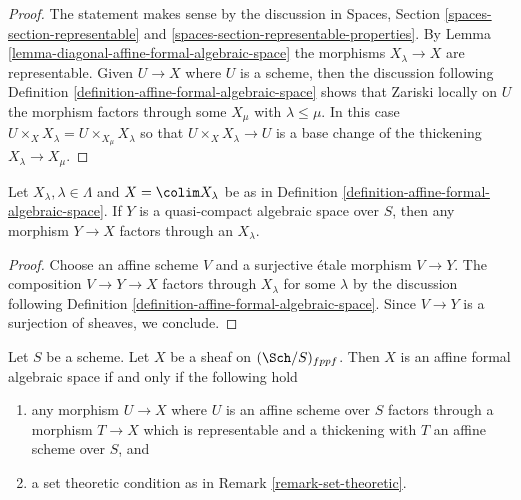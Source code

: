 \begin{proof}
The statement makes sense by the discussion in
Spaces, Section \ref{spaces-section-representable} and
\ref{spaces-section-representable-properties}.
By Lemma \ref{lemma-diagonal-affine-formal-algebraic-space}
the morphisms $X_\lambda \to X$ are representable.
Given $U \to X$ where $U$ is a scheme,
then the discussion following
Definition \ref{definition-affine-formal-algebraic-space}
shows that Zariski locally on $U$ the
morphism factors through some $X_\mu$ with $\lambda \leq \mu$.
In this case $U \times_X X_\lambda = U \times_{X_\mu} X_\lambda$
so that $U \times_X X_\lambda \to U$ is a base change of
the thickening $X_\lambda \to X_\mu$.
\end{proof}

\begin{lemma}
\label{lemma-factor-through-thickening}
Let $X_\lambda, \lambda \in \Lambda$ and $X = \colim X_\lambda$
be as in Definition \ref{definition-affine-formal-algebraic-space}.
If $Y$ is a quasi-compact algebraic space over $S$, then any
morphism $Y \to X$ factors through an $X_\lambda$.
\end{lemma}

\begin{proof}
Choose an affine scheme $V$ and a surjective \'etale morphism
$V \to Y$. The composition $V \to Y \to X$ factors through
$X_\lambda$ for some $\lambda$ by the discussion following
Definition \ref{definition-affine-formal-algebraic-space}.
Since $V \to Y$ is a surjection of sheaves, we conclude.
\end{proof}

\begin{lemma}
\label{lemma-characterize-affine-formal-algebraic-space}
Let $S$ be a scheme. Let $X$ be a sheaf on $(\Sch/S)_{fppf}$.
Then $X$ is an affine formal algebraic space if and only if
the following hold
\begin{enumerate}
\item any morphism $U \to X$ where $U$ is an affine scheme over $S$
factors through a morphism $T \to X$ which is representable and a
thickening with $T$ an affine scheme over $S$, and
\item a set theoretic condition as in Remark \ref{remark-set-theoretic}.
\end{enumerate}
\end{lemma}

